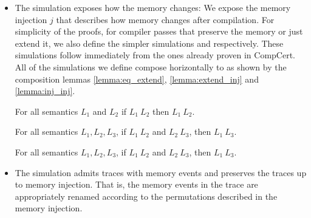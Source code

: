 \begin{itemize}
\item The simulation exposes how the memory changes: We expose the memory injection $j$ that describes how memory changes after compilation. For simplicity of the proofs, for compiler passes that preserve the memory or just extend it, we also define the simpler simulations   and  respectively. These simulations follow immediately from the ones already proven in CompCert. All of the simulations we define compose horizontally to  as shown by the composition lemmas \ref{lemma:eq_extend}, \ref{lemma:extend_inj} and \ref{lemma:inj_inj}.

\begin{lemma}\label{lemma:eq_extend}
For all semantics $L_1$ and $L_2$ if  $L_1 \ L_2$ then  $L_1 \ L_2$.\end{lemma} 
\begin{lemma}\label{lemma:extend_inj}
For all semantics $L_1, L_2, L_3$, if  $L_1 \ L_2$ and  $L_2 \ L_3$, then  $L_1 \ L_3$.
\end{lemma} 
\begin{lemma}\label{lemma:inj_inj}
For all semantics $L_1, L_2, L_3$, if  $L_1 \ L_2$ and  $L_2 \ L_3$, then  $L_1 \ L_3$.
\end{lemma} 

\item The simulation admits traces with memory events and preserves the traces up to memory injection. That is, the memory events in the trace are appropriately renamed according to the permutations described in the memory injection. 





\end{itemize}
